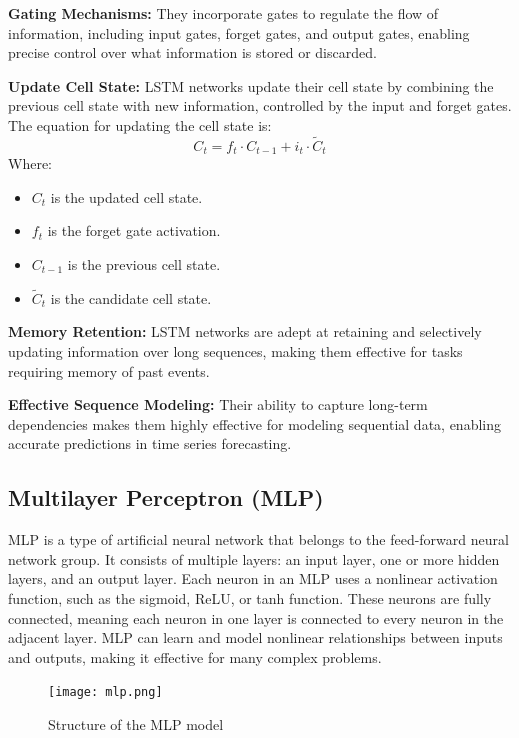\documentclass{ieeeojies}
\begin{document}
\textbf{Gating Mechanisms:} They incorporate gates to regulate the flow of information, including input gates, forget gates, and output gates, enabling precise control over what information is stored or discarded.

\textbf{Update Cell State:} LSTM networks update their cell state by combining the previous cell state with new information, controlled by the input and forget gates. The equation for updating the cell state is:
\begin{equation*}
  C_t = f_t \cdot C_{t-1} + i_t \cdot \tilde{C}_t
\end{equation*}
Where:
        \begin{itemize}
            \item \( C_t \) is the updated cell state.
            \item \( f_t \) is the forget gate activation.
            \item \( C_{t-1} \) is the previous cell state.
            \item \( \tilde{C}_t \) is the candidate cell state.
        \end{itemize}

\textbf{Memory Retention:} LSTM networks are adept at retaining and selectively updating information over long sequences, making them effective for tasks requiring memory of past events.
  
\textbf{Effective Sequence Modeling:} Their ability to capture long-term dependencies makes them highly effective for modeling sequential data, enabling accurate predictions in time series forecasting.

\subsection{Multilayer Perceptron (MLP)}
MLP is a type of artificial neural network that belongs to the feed-forward neural network group. It consists of multiple layers: an input layer, one or more hidden layers, and an output layer. Each neuron in an MLP uses a nonlinear activation function, such as the sigmoid, ReLU, or tanh function. These neurons are fully connected, meaning each neuron in one layer is connected to every neuron in the adjacent layer. MLP can learn and model nonlinear relationships between inputs and outputs, making it effective for many complex problems. \cite{mlp}

\begin{figure}[H]
  \centering
  \begin{minipage}{0.8\linewidth}
    \centering
    \texttt{[image: mlp.png]}
    \caption{Structure of the MLP model \cite{mlp_image}}
    \label{fig_mlp}
  \end{minipage}
\end{figure}
\end{document}
